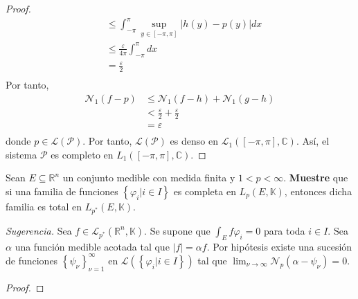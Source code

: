 \documentclass[12pt]{report}
\theoremstyle{largebreak}
\newcommand\abs[1]{\ensuremath{\left|#1\right|}}
\newcommand{\N}[2]{\ensuremath{\mathcal{N}_{#1}\left(#2\right)}}
\begin{document}
\begin{proof}
\begin{equation*}
\begin{split}
                &\leq\int_{-\pi}^\pi\sup_{ y\in[-\pi,\pi]}\abs{h(y)-p(y)}dx\\
                &\leq\frac{\varepsilon}{4\pi}\int_{-\pi}^\pi dx\\
                &=\frac{\varepsilon}{2}\\
            \end{split}
        \end{equation*}
        Por tanto,
        \begin{equation*}
            \begin{split}
                \N{1}{f-p}&\leq\N{1}{f-h}+\N{1}{g-h}\\
                &<\frac{\varepsilon}{2}+\frac{\varepsilon}{2}\\
                &=\varepsilon\\
            \end{split}
        \end{equation*}
        donde $p\in\mathcal{L}(\mathcal{P})$. Por tanto, $\mathcal{L}(\mathcal{P})$ es denso en $\mathcal{L}_1([-\pi,\pi],\mathbb{C})$. Así, el sistema $\mathcal{P}$ es completo en $L_1([-\pi,\pi],\mathbb{C})$.

    \end{proof}

    \begin{excer}
        Sean $E\subseteq\mathbb{R}^n$ un conjunto medible con medida finita y $1<p<\infty$. \textbf{Muestre} que si una familia de funciones $\left\{\varphi_i\Big|i\in I \right\}$ es completa en $L_p(E,\mathbb{K})$, entonces dicha familia es total en $L_{p^*}(E,\mathbb{K})$.

        \textit{Sugerencia.} Sea $f\in\mathcal{L}_{p^*}(\mathbb{R}^n,\mathbb{K})$. Se supone que $\int_Ef\varphi_i=0$ para toda $i\in I$. Sea $\alpha$ una función medible acotada tal que $\abs{f}=\alpha f$. Por hipótesis existe una sucesión de funciones $\left\{\psi_\nu \right\}_{\nu=1}^\infty$ en $\mathcal{L}(\left\{\varphi_i\Big|i\in I \right\})$ tal que $\lim_{\nu\rightarrow\infty}\N{p}{\alpha-\psi_\nu}=0$.
    \end{excer}

    \begin{proof}
        
    \end{proof}
\end{document}
